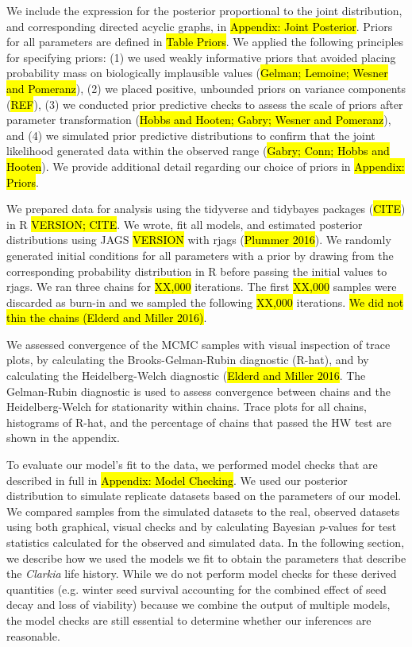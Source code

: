 \documentclass[12pt, oneside, titlepage]{article}   	%
\begin{document}
We include the expression for the posterior proportional to the joint distribution, and corresponding directed acyclic graphs, in \hl{Appendix: Joint Posterior}. Priors for all parameters are defined in \hl{Table Priors}. We applied the following principles for specifying priors: (1) we used weakly informative priors that avoided placing probability mass on biologically implausible values (\hl{Gelman; Lemoine; Wesner and Pomeranz}), (2) we placed positive, unbounded priors on variance components (\hl{REF}), (3) we conducted prior predictive checks to assess the scale of priors after parameter transformation (\hl{Hobbs and Hooten; Gabry; Wesner and Pomeranz}), and (4) we simulated prior predictive distributions to confirm that the joint likelihood generated data within the observed range (\hl{Gabry; Conn; Hobbs and Hooten}). We provide additional detail regarding our choice of priors in \hl{Appendix: Priors}. 

We prepared data for analysis using the tidyverse and tidybayes packages (\hl{CITE}) in R \hl{VERSION; CITE}. We wrote, fit all models, and estimated posterior distributions using JAGS \hl{VERSION} with rjags (\hl{Plummer 2016}). We randomly generated initial conditions for all parameters with a prior by drawing from the corresponding probability distribution in R before passing the initial values to rjags. We ran three chains for \hl{XX,000} iterations. The first \hl{XX,000} samples were discarded as burn-in and we sampled the following \hl{XX,000} iterations. \hl{We did not thin the chains (Elderd and Miller 2016)}.

We assessed convergence of the MCMC samples with visual inspection of trace plots, by calculating the Brooks-Gelman-Rubin diagnostic (R-hat), and by calculating the Heidelberg-Welch diagnostic (\hl{Elderd and Miller 2016}. The Gelman-Rubin diagnostic is used to assess convergence between chains and the Heidelberg-Welch for stationarity within chains. Trace plots for all chains, histograms of R-hat, and the percentage of chains that passed the HW test are shown in the appendix. 
 
To evaluate our model's fit to the data, we performed model checks that are described in full in \hl{Appendix: Model Checking}. We used our posterior distribution to simulate replicate datasets based on the parameters of our model. We compared samples from the simulated datasets to the real, observed datasets using both graphical, visual checks and by calculating Bayesian \textit{p}-values for test statistics calculated for the observed and simulated data. In the following section, we describe how we used the models we fit to obtain the parameters that describe the \textit{Clarkia} life history. While we do not perform model checks for these derived quantities (e.g. winter seed survival accounting for the combined effect of seed decay and loss of viability) because we combine the output of multiple models, the model checks are still essential to determine whether our inferences are reasonable.
\end{document}
